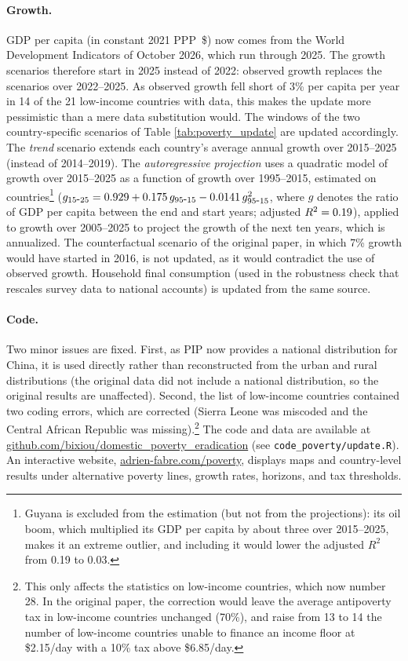 \paragraph{Growth.} GDP per capita (in constant 2021 PPP~\$) now comes from the World Development Indicators of October 2026, which run through 2025. The growth scenarios therefore start in 2025 instead of 2022: observed growth replaces the scenarios over 2022--2025. As observed growth fell short of 3\% per capita per year in 14 of the 21 low-income countries with data, this makes the update more pessimistic than a mere data substitution would. The windows of the two country-specific scenarios of Table \ref{tab:poverty_update} are updated accordingly. The \textit{trend} scenario extends each country's average annual growth over 2015--2025 (instead of 2014--2019). The \textit{autoregressive projection} uses a quadratic model of growth over 2015--2025 as a function of growth over 1995--2015, estimated on \upRegN{} countries\footnote{Guyana is excluded from the estimation (but not from the projections): its oil boom, which multiplied its GDP per capita by about three over 2015--2025, makes it an extreme outlier, and including it would lower the adjusted $R^2$ from 0.19 to 0.03.} ($g_{15\mbox{-}25} = 0.929 + 0.175\, g_{95\mbox{-}15} -0.0141\, g_{95\mbox{-}15}^2$, where $g$ denotes the ratio of GDP per capita between the end and start years; adjusted $R^2 = 0.19$), applied to growth over 2005--2025 to project the growth of the next ten years, which is annualized. The counterfactual scenario of the original paper, in which 7\% growth would have started in 2016, is not updated, as it would contradict the use of observed growth. Household final consumption (used in the robustness check that rescales survey data to national accounts) is updated from the same source.

\paragraph{Code.} Two minor issues are fixed. First, as PIP now provides a national distribution for China, it is used directly rather than reconstructed from the urban and rural distributions (the original data did not include a national distribution, so the original results are unaffected). Second, the list of low-income countries contained two coding errors, which are corrected (Sierra Leone was miscoded and the Central African Republic was missing).\footnote{This only affects the statistics on low-income countries, which now number 28. In the original paper, the correction would leave the average antipoverty tax in low-income countries unchanged (70\%), and raise from 13 to 14 the number of low-income countries unable to finance an income floor at \$2.15/day with a 10\% tax above \$6.85/day.} The code and data are available at \href{https://github.com/bixiou/domestic_poverty_eradication}{github.com/bixiou/domestic\_poverty\_eradication} (see \texttt{code\_poverty/update.R}). An interactive website, \href{https://adrien-fabre.com/poverty}{adrien-fabre.com/poverty}, displays maps and country-level results under alternative poverty lines, growth rates, horizons, and tax thresholds.

